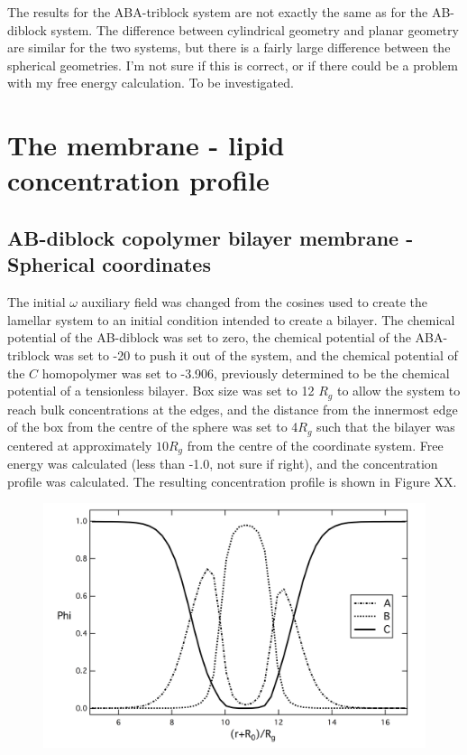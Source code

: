 \documentclass[11pt]{article} %
\begin{document}
The results for the ABA-triblock system are not exactly the same as for the AB-diblock system. The difference between cylindrical geometry and planar geometry are similar for the two systems, but there is a fairly large difference between the spherical geometries. I'm not sure if this is correct, or if there could be a problem with my free energy calculation. To be investigated. 


\section{The membrane - lipid concentration profile}
\subsection{AB-diblock copolymer bilayer membrane - Spherical coordinates}

The initial $\omega$ auxiliary field was changed from the cosines used to create the lamellar system to an initial condition intended to create a bilayer. The chemical potential of the AB-diblock was set to zero, the chemical potential of the ABA-triblock was set to -20 to push it out of the system, and the chemical potential of the $C$ homopolymer was set to -3.906, previously determined to be the chemical potential of a tensionless bilayer. Box size was set to 12 $R_g$ to allow the system to reach bulk concentrations at the edges, and the distance from the innermost edge of the box from the centre of the sphere was set to 4$R_g$ such that the bilayer was centered at approximately $10R_g$ from the centre of the coordinate system. Free energy was calculated (less than -1.0, not sure if right), and the concentration profile was calculated. The resulting concentration profile is shown in Figure XX.

\begin{figure}[H]
\centering
\includegraphics[scale=0.6]{bilayer_AB}
\centering
\end{figure}
\end{document}
